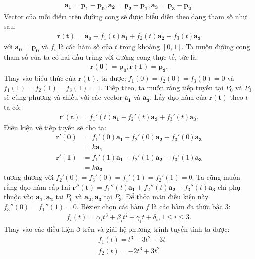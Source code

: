 \begin{multicols}{2}
	\begin{align*}
		\pmb{a_1}=\pmb{p_1}-\pmb{p_0},\pmb{a_2}=\pmb{p_2}-\pmb{p_1},\pmb{a_3}=\pmb{p_3}-\pmb{p_2}.
	\end{align*}
	Vector của mỗi điểm trên đường cong sẽ được biểu diễn theo dạng tham số như sau:
	\begin{align*}
		\pmb{r(t)}=\pmb{a_0} + f_{1}(t) \pmb{a_1}+f_{2} (t) \pmb{a_2}+f_{3} (t) \pmb{a_3}
	\end{align*}
	với $\pmb{a_0}= \pmb{p_0}$ và $f_{i}$ là các hàm số của $t$ trong khoảng $[0,1]$.
	\vskip 0.1cm 
	Ta muốn đường cong tham số của ta có hai đầu trùng với đường cong thực tế, tức là:
	\begin{align*}
		\pmb{r(0)}=\pmb{p_0},\pmb{r(1)}=\pmb{p_3}. 
	\end{align*}
	Thay vào biểu thức của $\pmb{r(t)}$, ta được: $f_{1} (0)=f_{2} (0)=f_{3} (0)=0$ và $f_{1} (1)=f_{2}(1)=f_{3}(1)=1$.
	\vskip 0.1cm
	Tiếp theo, ta muốn rằng tiếp tuyến tại $P_0$ và $P_3$ sẽ cùng phương và chiều với các vector $\pmb{a_1}$ và $\pmb{a_3}$. Lấy đạo hàm của $\pmb{r(t)}$ theo $t$ ta có:
	\begin{align*}
		\pmb{r' (t)}=f_{1}' (t) \pmb{a_1}+f_{2}' (t) \pmb{a_3}+f_{3}' (t) \pmb{a_3}.
	\end{align*}
	Điều kiện về tiếp tuyến sẽ cho ta:
	\begin{align*}
		\pmb{r'(0)}&=f_{1}' (0) \pmb{a_1}+f_{2}' (0) \pmb{a_2}+f_{3}'(0) \pmb{a_3}\\
		&=k\pmb{a_1}\\
		\pmb{r'(1)}&=f_{1}' (1) \pmb{a_1}+f_{2}' (1) \pmb{a_2}+f_{3}'(1) \pmb{a_3}\\
		&=k\pmb{a_3}
	\end{align*}
	tương đương với $f_{2}' (0)=f_{3}' (0) = f_{1}' (1)=f_{2}' (1)=0$.
	\vskip 0.1cm
	Ta cũng muốn rằng đạo hàm cấp hai $\pmb{r''(t)}=f_{1}'' (t) \pmb{a_1}+f_{2}'' (t) \pmb{a_2}+f_{3}'' (t) \pmb{a_3}$ chỉ phụ thuộc vào $\pmb{a_1,a_2}$ tại $P_0$ và ${\pmb{a_2,a_3}}$ tại $P_3$. Để thỏa mãn điều kiện này $f_{3}'' (0)=f_{1}'' (1)=0$.
	\vskip 0.1cm
	Bézier chọn các hàm $f$ là các hàm đa thức bậc $3$:
	\begin{align*}
		f_{i}(t)=\alpha_i t^3 + \beta_i t^2+\gamma_i t + \delta_i,1 \le i \le 3.
	\end{align*}
	Thay vào các điều kiện ở trên và giải hệ phương trình tuyến tính ta được:
	\begin{align*}
		&f_{1} (t)=t^3-3t^2+3t\\
		&f_{2} (t)=-2t^3+3t^2\\

\end{align*}
\end{multicols}
